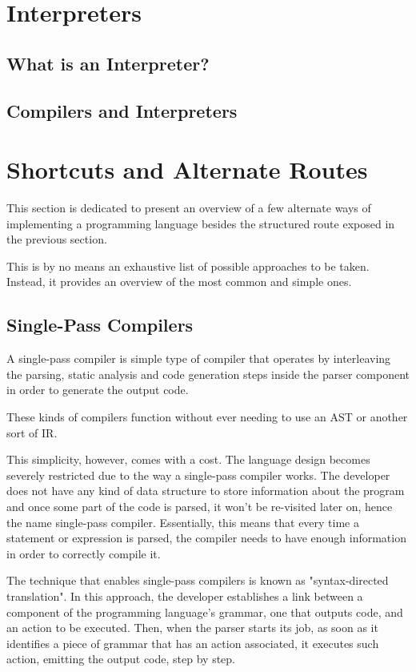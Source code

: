\section{Interpreters}
\subsection{What is an Interpreter?}

\subsection{Compilers and Interpreters}



\section{Shortcuts and Alternate Routes}
This section is dedicated to present an overview of a few alternate ways of implementing a programming language besides the structured route exposed in the previous section. 

This is by no means an exhaustive list of possible approaches to be taken. Instead, it provides an overview of the most common and simple ones.

\subsection{Single-Pass Compilers}
A single-pass compiler is simple type of compiler that operates by interleaving the parsing, static analysis and code generation steps inside the parser component in order to generate the output code.

These kinds of compilers function without ever needing to use an AST or another sort of IR.

This simplicity, however, comes with a cost. The language design becomes severely restricted due to the way a single-pass compiler works. The developer does not have any kind of data structure to store information about the program and once some part of the code is parsed, it won't be re-visited later on, hence the name single-pass compiler. Essentially, this means that every time a statement or expression is parsed, the compiler needs to have enough information in order to correctly compile it.

The technique that enables single-pass compilers is known as "syntax-directed translation". In this approach, the developer establishes a link between a component of the programming language's grammar, one that outputs code, and an action to be executed. Then, when the parser starts its job, as soon as it identifies a piece of grammar that has an action associated, it executes such action, emitting the output code, step by step.

